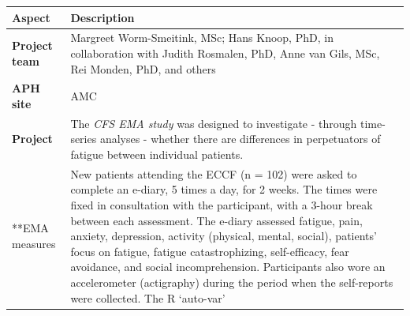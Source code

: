 \documentclass[]{book}
\begin{document}
\begin{longtable}[]{@{}ll@{}}
\toprule
\begin{minipage}[b]{0.25\columnwidth}\raggedright\strut
\textbf{Aspect}\strut
\end{minipage} & \begin{minipage}[b]{0.69\columnwidth}\raggedright\strut
\textbf{Description}\strut
\end{minipage}\tabularnewline
\midrule
\endhead
\begin{minipage}[t]{0.25\columnwidth}\raggedright\strut
\textbf{Project team}\strut
\end{minipage} & \begin{minipage}[t]{0.69\columnwidth}\raggedright\strut
Margreet Worm-Smeitink, MSc; Hans Knoop, PhD, in collaboration with
Judith Rosmalen, PhD, Anne van Gils, MSc, Rei Monden, PhD, and
others\strut
\end{minipage}\tabularnewline
\begin{minipage}[t]{0.25\columnwidth}\raggedright\strut
\textbf{APH site}\strut
\end{minipage} & \begin{minipage}[t]{0.69\columnwidth}\raggedright\strut
AMC\strut
\end{minipage}\tabularnewline
\begin{minipage}[t]{0.25\columnwidth}\raggedright\strut
\textbf{Project}\strut
\end{minipage} & \begin{minipage}[t]{0.69\columnwidth}\raggedright\strut
The \emph{CFS EMA study} was designed to investigate - through
time-series analyses - whether there are differences in perpetuators of
fatigue between individual patients.\strut
\end{minipage}\tabularnewline
\begin{minipage}[t]{0.25\columnwidth}\raggedright\strut
**EMA measures\strut
\end{minipage} & \begin{minipage}[t]{0.69\columnwidth}\raggedright\strut
New patients attending the ECCF (n = 102) were asked to complete an
e-diary, 5 times a day, for 2 weeks. The times were fixed in
consultation with the participant, with a 3-hour break between each
assessment. The e-diary assessed fatigue, pain, anxiety, depression,
activity (physical, mental, social), patients' focus on fatigue, fatigue
catastrophizing, self-efficacy, fear avoidance, and social
incomprehension. Participants also wore an accelerometer (actigraphy)
during the period when the self-reports were collected. The R `auto-var'

\end{minipage}
\end{longtable}
\end{document}
